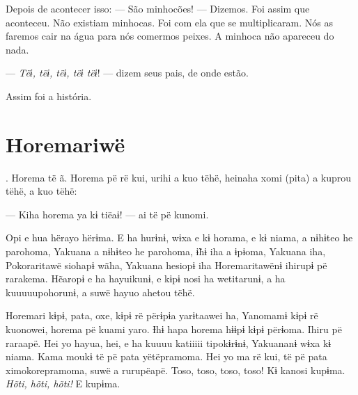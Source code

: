 Depois de acontecer isso: --- São minhocões! --- Dizemos. Foi assim que aconteceu.
Não existiam minhocas. Foi com ela que se multiplicaram. Nós as faremos
cair na água para nós comermos peixes. A minhoca não apareceu do nada. 


--- \textit{Tëɨ, tëɨ, tëɨ, tëɨ tëɨ}! --- dizem seus pais, de onde estão. 

Assim foi a história.

\chapter{Horemariwë}

. Horema të ã. Horema pë rë kui, urihi a kuo tëhë, heinaha xomi
(pita) a kuprou tëhë, a kuo tëhë:

--- Kiha horema ya kɨ tiëaɨ! --- ai të pë kunomi. 



Opi e hua hërayo hërɨma. E ha hurɨnɨ, wɨxa e kɨ horama, e kɨ niama, a
nɨhɨteo he parohoma, Yakuana a nɨhɨteo he parohoma, ɨ̃hɨ iha a ɨpɨoma,
Yakuana iha, Pokoraritawë siohapɨ wãha, Yakuana hesiopɨ iha
Horemaritawënɨ ihirupɨ pë rarakema. Hẽaropɨ e ha hayuikunɨ, e kɨpɨ nosi
ha wetitarunɨ, a ha kuuuuupohorunɨ, a suwë hayuo ahetou tëhë. 

Horemari kɨpɨ, pata, oxe, kɨpɨ rë përɨpɨa yarɨtaawei ha, Yanomamɨ kɨpɨ
rë kuonowei, horema pë kuami yaro. Ɨhɨ hapa horema hɨɨpɨ kɨpɨ përɨoma.
Ihiru pë raraapë. Hei yo hayua, hei, e ha kuuuu katiiiii tipokɨrɨnɨ,
Yakuananɨ wɨxa kɨ niama. Kama moukɨ të pë pata yëtëpramoma. Hei yo ma rë
kui, të pë pata ximokorepramoma, suwë a rurupëapë. Toso, toso, toso,
toso! Kɨ kanosi kupɨma. \textit{Hõti, hõti, hõti!} E kupɨma. 

